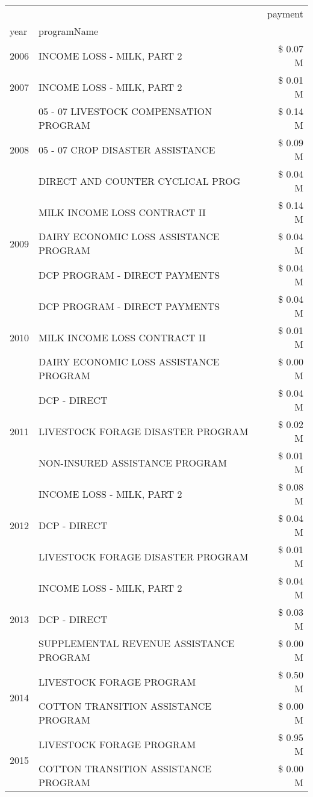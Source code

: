 \begin{tabular}{llr}
\toprule
 &  & payment \\
year & programName &  \\
\midrule
2006 & INCOME LOSS - MILK, PART 2 & \$ 0.07 M \\
\cline{1-3}
2007 & INCOME LOSS - MILK, PART 2 & \$ 0.01 M \\
\cline{1-3}
\multirow[t]{3}{*}{2008} & 05 - 07 LIVESTOCK COMPENSATION PROGRAM & \$ 0.14 M \\
 & 05 - 07 CROP DISASTER ASSISTANCE & \$ 0.09 M \\
 & DIRECT AND COUNTER CYCLICAL PROG & \$ 0.04 M \\
\cline{1-3}
\multirow[t]{3}{*}{2009} & MILK INCOME LOSS CONTRACT II & \$ 0.14 M \\
 & DAIRY ECONOMIC LOSS ASSISTANCE PROGRAM & \$ 0.04 M \\
 & DCP PROGRAM - DIRECT PAYMENTS & \$ 0.04 M \\
\cline{1-3}
\multirow[t]{3}{*}{2010} & DCP PROGRAM - DIRECT PAYMENTS & \$ 0.04 M \\
 & MILK INCOME LOSS CONTRACT II & \$ 0.01 M \\
 & DAIRY ECONOMIC LOSS ASSISTANCE PROGRAM & \$ 0.00 M \\
\cline{1-3}
\multirow[t]{3}{*}{2011} & DCP - DIRECT & \$ 0.04 M \\
 & LIVESTOCK FORAGE DISASTER PROGRAM & \$ 0.02 M \\
 & NON-INSURED ASSISTANCE PROGRAM & \$ 0.01 M \\
\cline{1-3}
\multirow[t]{3}{*}{2012} & INCOME LOSS - MILK, PART 2 & \$ 0.08 M \\
 & DCP - DIRECT & \$ 0.04 M \\
 & LIVESTOCK FORAGE DISASTER PROGRAM & \$ 0.01 M \\
\cline{1-3}
\multirow[t]{3}{*}{2013} & INCOME LOSS - MILK, PART 2 & \$ 0.04 M \\
 & DCP - DIRECT & \$ 0.03 M \\
 & SUPPLEMENTAL REVENUE ASSISTANCE PROGRAM & \$ 0.00 M \\
\cline{1-3}
\multirow[t]{2}{*}{2014} & LIVESTOCK FORAGE PROGRAM & \$ 0.50 M \\
 & COTTON TRANSITION ASSISTANCE PROGRAM & \$ 0.00 M \\
\cline{1-3}
\multirow[t]{2}{*}{2015} & LIVESTOCK FORAGE PROGRAM & \$ 0.95 M \\
 & COTTON TRANSITION ASSISTANCE PROGRAM & \$ 0.00 M \\

\end{tabular}
